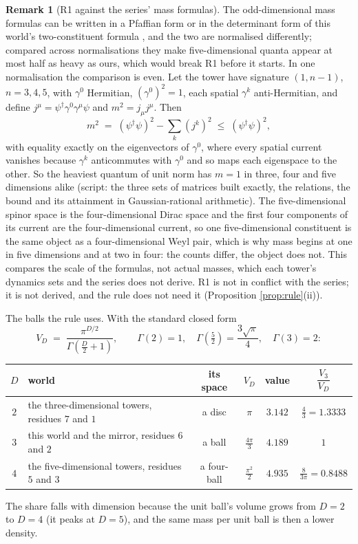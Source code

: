 \documentclass[11pt]{article}
\theoremstyle{definition}
\newtheorem{remark}[theorem]{Remark}
\begin{document}
\begin{remark}[R1 against the series' mass formulas]\label{rem:massR1}
The odd-dimensional mass formulas can be written in a Pfaffian form or in the determinant form of this world's two-constituent formula \cite[Prop.~4.1]{ButlerT11}, and the two are normalised differently; compared across normalisations they make five-dimensional quanta appear at most half as heavy as ours, which would break R1 before it starts. In one normalisation the comparison is even. Let the tower have signature $(1, n-1)$, $n = 3, 4, 5$, with $\gamma^{0}$ Hermitian, $(\gamma^{0})^{2} = 1$, each spatial $\gamma^{k}$ anti-Hermitian, and define $j^{\mu} = \psi^{\dagger}\gamma^{0}\gamma^{\mu}\psi$ and $m^{2} = j_{\mu}j^{\mu}$. Then
\[
m^{2} \;=\; (\psi^{\dagger}\psi)^{2} - \sum_{k}(j^{k})^{2} \;\le\; (\psi^{\dagger}\psi)^{2},
\]
with equality exactly on the eigenvectors of $\gamma^{0}$, where every spatial current vanishes because $\gamma^{k}$ anticommutes with $\gamma^{0}$ and so maps each eigenspace to the other. So the heaviest quantum of unit norm has $m = 1$ in three, four and five dimensions alike (script: the three sets of matrices built exactly, the relations, the bound and its attainment in Gaussian-rational arithmetic). The five-dimensional spinor space is the four-dimensional Dirac space and the first four components of its current are the four-dimensional current, so one five-dimensional constituent is the same object as a four-dimensional Weyl pair, which is why mass begins at one in five dimensions and at two in four: the counts differ, the object does not. This compares the scale of the formulas, not actual masses, which each tower's dynamics sets and the series does not derive. R1 is not in conflict with the series; it is not derived, and the rule does not need it (Proposition \ref{prop:rule}(ii)).
\end{remark}

The balls the rule uses. With the standard closed form
\[
V_{D} \;=\; \frac{\pi^{D/2}}{\Gamma\!\left(\frac{D}{2} + 1\right)}, \qquad \Gamma(2) = 1, \quad \Gamma\!\left(\tfrac{5}{2}\right) = \frac{3\sqrt{\pi}}{4}, \quad \Gamma(3) = 2 :
\]
\begin{center}\small
\begin{tabular}{clcccc}
\toprule
$D$ & world & its space & $V_{D}$ & value & $\dfrac{V_{3}}{V_{D}}$ \\[6pt]
\midrule
$2$ & the three-dimensional towers, residues $7$ and $1$ & a disc & $\pi$ & $3.142$ & $\tfrac{4}{3} = 1.3333$ \\[3pt]
$3$ & this world and the mirror, residues $6$ and $2$ & a ball & $\tfrac{4\pi}{3}$ & $4.189$ & $1$ \\[3pt]
$4$ & the five-dimensional towers, residues $5$ and $3$ & a four-ball & $\tfrac{\pi^{2}}{2}$ & $4.935$ & $\tfrac{8}{3\pi} = 0.8488$ \\[3pt]
\bottomrule
\end{tabular}
\end{center}
The share falls with dimension because the unit ball's volume grows from $D = 2$ to $D = 4$ (it peaks at $D = 5$), and the same mass per unit ball is then a lower density.
\end{document}
